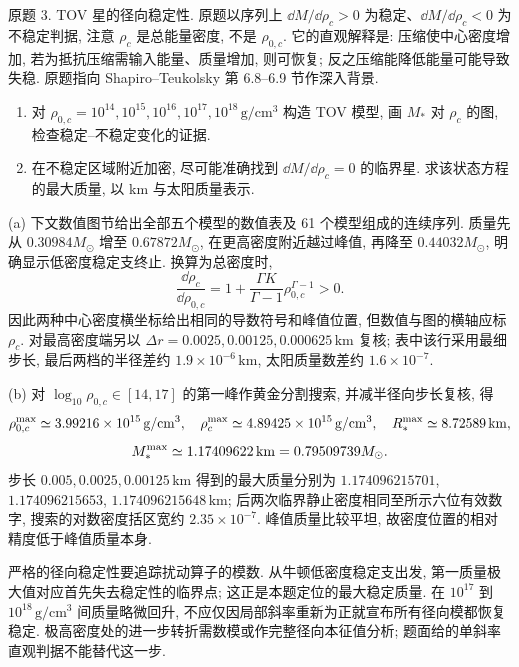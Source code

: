 \begin{exercise}\label{ps:10.3}
原题 3. TOV 星的径向稳定性. 原题以序列上 $\dd M/\dd\rho_c>0$ 为稳定、$\dd M/\dd\rho_c<0$ 为不稳定判据, 注意 $\rho_c$ 是总能量密度, 不是 $\rho_{0,c}$. 它的直观解释是: 压缩使中心密度增加, 若为抵抗压缩需输入能量、质量增加, 则可恢复; 反之压缩能降低能量可能导致失稳. 原题指向 Shapiro--Teukolsky 第 6.8--6.9 节作深入背景.
\begin{enumerate}[label=(\alph*)]
\item 对 $\rho_{0,c}=10^{14},10^{15},10^{16},10^{17},10^{18}\,\mathrm{g/cm^3}$ 构造 TOV 模型, 画 $M_*$ 对 $\rho_c$ 的图, 检查稳定--不稳定变化的证据.
\item 在不稳定区域附近加密, 尽可能准确找到 $\dd M/\dd\rho_c=0$ 的临界星. 求该状态方程的最大质量, 以 km 与太阳质量表示.
\end{enumerate}
\end{exercise}
\begin{solution}
(a) 下文数值图节给出全部五个模型的数值表及 61 个模型组成的连续序列. 质量先从 $0.30984M_\odot$ 增至 $0.67872M_\odot$, 在更高密度附近越过峰值, 再降至 $0.44032M_\odot$, 明确显示低密度稳定支终止. 换算为总密度时,
\[
\frac{\dd\rho_c}{\dd\rho_{0,c}}=1+\frac{\Gamma K}{\Gamma-1}\rho_{0,c}^{\Gamma-1}>0.
\]
因此两种中心密度横坐标给出相同的导数符号和峰值位置, 但数值与图的横轴应标 $\rho_c$. 对最高密度端另以 $\Delta r=0.0025,0.00125,0.000625\,\mathrm{km}$ 复核; 表中该行采用最细步长, 最后两档的半径差约 $1.9\times10^{-6}\,\mathrm{km}$, 太阳质量数差约 $1.6\times10^{-7}$.

(b) 对 $\log_{10}\rho_{0,c}\in[14,17]$ 的第一峰作黄金分割搜索, 并减半径向步长复核, 得
\[
\rho_{0,c}^{\rm max}\simeq3.99216\times10^{15}\,\mathrm{g/cm^3},\quad
\rho_c^{\rm max}\simeq4.89425\times10^{15}\,\mathrm{g/cm^3},\quad
R_*^{\rm max}\simeq8.72589\,\mathrm{km},
\]
\[
M_*^{\rm max}\simeq1.17409622\,\mathrm{km}=0.79509739M_\odot.
\]
步长 $0.005,0.0025,0.00125\,\mathrm{km}$ 得到的最大质量分别为
$1.174096215701$, $1.174096215653$, $1.174096215648\,\mathrm{km}$; 后两次临界静止密度相同至所示六位有效数字, 搜索的对数密度括区宽约 $2.35\times10^{-7}$. 峰值质量比较平坦, 故密度位置的相对精度低于峰值质量本身.

严格的径向稳定性要追踪扰动算子的模数. 从牛顿低密度稳定支出发, 第一质量极大值对应首先失去稳定性的临界点; 这正是本题定位的最大稳定质量. 在 $10^{17}$ 到 $10^{18}\,\mathrm{g/cm^3}$ 间质量略微回升, 不应仅因局部斜率重新为正就宣布所有径向模都恢复稳定. 极高密度处的进一步转折需数模或作完整径向本征值分析; 题面给的单斜率直观判据不能替代这一步.
\end{solution}

